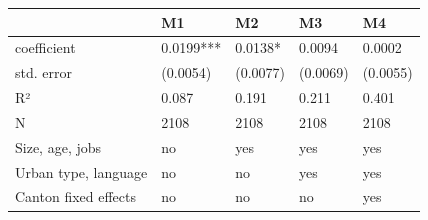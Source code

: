 \begin{tabular}{lllll}
\toprule
 & M1 & M2 & M3 & M4 \\
\midrule
coefficient & 0.0199*** & 0.0138* & 0.0094 & 0.0002 \\
std. error & (0.0054) & (0.0077) & (0.0069) & (0.0055) \\
R² & 0.087 & 0.191 & 0.211 & 0.401 \\
N & 2108 & 2108 & 2108 & 2108 \\
Size, age, jobs & no & yes & yes & yes \\
Urban type, language & no & no & yes & yes \\
Canton fixed effects & no & no & no & yes \\
\bottomrule
\end{tabular}
